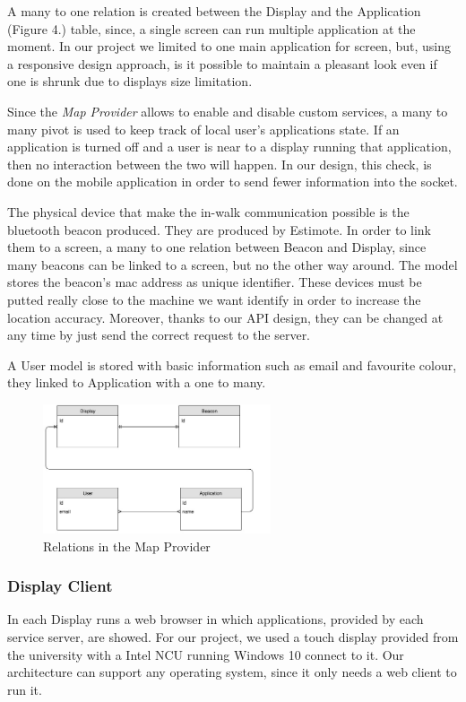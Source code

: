 \documentclass[]{usiinfbachelorproject}
\begin{document}
A many to one relation is created between the Display and the Application (Figure 4.) table, since, a single screen can run multiple application at the moment. In our project we limited to one main application for screen, but, using a responsive design approach, is it possible to maintain a pleasant look even if one is shrunk due to displays size limitation.

Since the \emph{Map Provider} allows to enable and disable custom services, a many to many pivot is used to keep track of local user's applications state. If an application is turned off and a user is near to a display running that application, then no interaction between the two will happen. In our design, this check, is done on the mobile application in order to send fewer information into the socket.

The physical device that make the in-walk communication possible is the bluetooth beacon produced. They are produced by Estimote. In order to link them to a screen, a many to one relation between Beacon and Display, since many beacons can be linked to a screen, but no the other way around. The model stores the beacon's mac address as unique identifier. These devices must be putted really close to the machine we want identify in order to increase the location accuracy. Moreover, thanks to our API design, they can be changed at any time by just send the correct request to the server.

A User model is stored with basic information such as email and favourite colour, they linked to Application with a one to many. 
\begin{figure}[H]
  \centering
  \includegraphics[width=0.6\textwidth]{./images/TacitaRelations.jpg}
   \caption{Relations in the Map Provider}

\end{figure} 

\subsubsection{Display Client}
In each Display runs a web browser in which applications, provided by each service server, are showed. For our project, we used a touch display provided from the university with a Intel NCU running Windows 10 connect to it. Our architecture can support any operating system, since it only needs a web client to run it.
  
\end{document}
